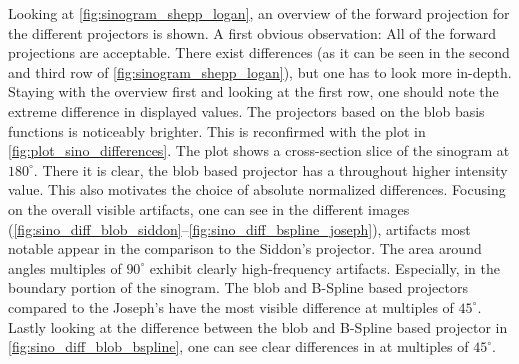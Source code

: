 Looking at \autoref{fig:sinogram_shepp_logan}, an overview of the forward projection for the
different projectors is shown. A first obvious observation: All of the forward projections are
acceptable. There exist differences (as it can be seen in the second and third row of
\autoref{fig:sinogram_shepp_logan}), but one has to look more in-depth. Staying with the overview
first and looking at the first row, one should note the extreme difference in displayed values. The
projectors based on the blob basis functions is noticeably brighter. This is reconfirmed with the
plot in \autoref{fig:plot_sino_differences}. The plot shows a cross-section slice of the sinogram at
\(180^\circ\). There it is clear, the blob based projector has a throughout higher intensity value.
This also motivates the choice of absolute normalized differences. Focusing on the overall visible
artifacts, one can see in the different images
(\autoref{fig:sino_diff_blob_siddon}--\autoref{fig:sino_diff_bspline_joseph}), artifacts most
notable appear in the comparison to the Siddon's projector. The area around angles multiples of
\(90^\circ\) exhibit clearly high-frequency artifacts. Especially, in the boundary portion of the
sinogram. The blob and B-Spline based projectors compared to the Joseph's have the most visible
difference at multiples of \(45^\circ\). Lastly looking at the difference between the blob and
B-Spline based projector in \autoref{fig:sino_diff_blob_bspline}, one can see clear differences in
at multiples of \(45^\circ\).

